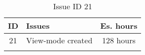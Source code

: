 \begin{longtable} { | c | p{12cm} | c | } 
\hline
	ID 	&	Issues	&		 Es. hours \\\hline
	21 	&	View-mode created	&	128 hours \\\hline
\caption{Issue ID 21}
\label{tab:spr3_viewmodecreated}
\end{longtable}

